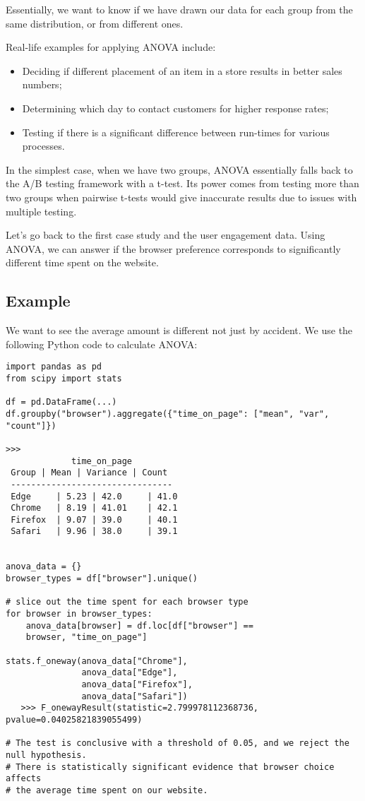 \documentclass{article}
\theoremstyle{definition}
\theoremstyle{theorem}
\theoremstyle{theorem}
\theoremstyle{theorem}
\theoremstyle{theorem}
\theoremstyle{definition}
\theoremstyle{definition}
\theoremstyle{definition}
\theoremstyle{definition}
\theoremstyle{definition}
\begin{document}
Essentially, we want to know if we have drawn our data for each group from the same distribution, or from different ones.

Real-life examples for applying ANOVA include:

\begin{itemize}
    \item Deciding if different placement of an item in a store results in better sales numbers;
    \item Determining which day to contact customers for higher response rates;
    \item Testing if there is a significant difference between run-times for various processes.
\end{itemize}

In the simplest case, when we have two groups, ANOVA essentially falls back to the A/B testing framework with a t-test. Its power comes from testing more than two groups when pairwise t-tests would give inaccurate results due to issues with multiple testing.

Let's go back to the first case study and the user engagement data. Using ANOVA, we can answer if the browser preference corresponds to significantly different time spent on the website.


\subsection*{Example}

We want to see the average amount is different not just by accident. We use the following Python code to calculate ANOVA:

\begin{lstlisting}
import pandas as pd
from scipy import stats

df = pd.DataFrame(...)
df.groupby("browser").aggregate({"time_on_page": ["mean", "var", "count"]})

>>>
             time_on_page
 Group | Mean | Variance | Count
 --------------------------------
 Edge     | 5.23 | 42.0     | 41.0
 Chrome   | 8.19 | 41.01    | 42.1
 Firefox  | 9.07 | 39.0     | 40.1
 Safari   | 9.96 | 38.0     | 39.1


anova_data = {}
browser_types = df["browser"].unique()

# slice out the time spent for each browser type
for browser in browser_types:
    anova_data[browser] = df.loc[df["browser"] ==
    browser, "time_on_page"]

stats.f_oneway(anova_data["Chrome"], 
               anova_data["Edge"], 
               anova_data["Firefox"],
               anova_data["Safari"]) 
   >>> F_onewayResult(statistic=2.799978112368736, pvalue=0.04025821839055499)

# The test is conclusive with a threshold of 0.05, and we reject the null hypothesis. 
# There is statistically significant evidence that browser choice affects 
# the average time spent on our website.
               
\end{lstlisting}
\end{document}
